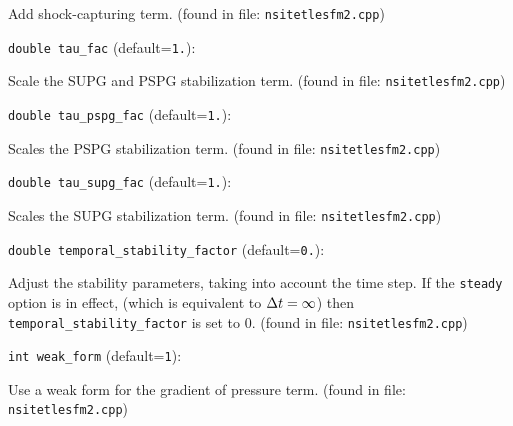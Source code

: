 Add shock-capturing term.
 (found in file: \verb+nsitetlesfm2.cpp+)
\item\verb+double tau_fac+ {\rm(default=\verb|1.|)}:

Scale the SUPG and PSPG stabilization term. 
 (found in file: \verb+nsitetlesfm2.cpp+)
\item\verb+double tau_pspg_fac+ {\rm(default=\verb|1.|)}:

Scales the PSPG stabilization term. 
 (found in file: \verb+nsitetlesfm2.cpp+)
\item\verb+double tau_supg_fac+ {\rm(default=\verb|1.|)}:

Scales the SUPG stabilization term. 
 (found in file: \verb+nsitetlesfm2.cpp+)
\item\verb+double temporal_stability_factor+ {\rm(default=\verb|0.|)}:

Adjust the stability parameters, taking into account
the time step. If the  \verb+steady+  option is in effect,
(which is equivalent to ${\Delta t}=\infty$) then
 \verb+temporal_stability_factor+  is set to 0.
 (found in file: \verb+nsitetlesfm2.cpp+)
\item\verb+int weak_form+ {\rm(default=\verb|1|)}:

Use a weak form for the gradient of pressure term.
 (found in file: \verb+nsitetlesfm2.cpp+)
